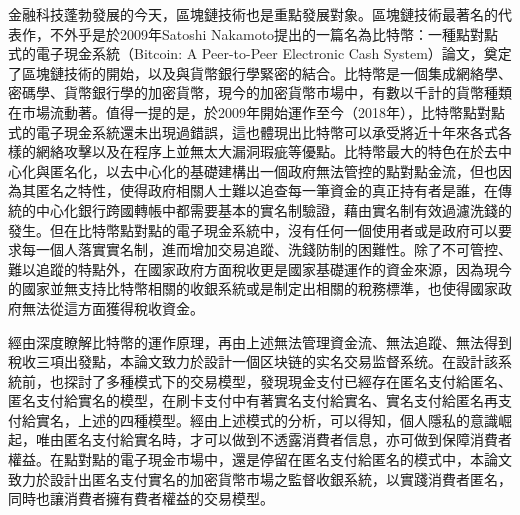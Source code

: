 \begin{cabstract}

	金融科技蓬勃發展的今天，區塊鏈技術也是重點發展對象。區塊鏈技術最著名的代表作，不外乎是於2009年Satoshi Nakamoto提出的一篇名為比特幣：一種點對點式的電子現金系統（Bitcoin: A Peer-to-Peer Electronic Cash System）論文\parencite{bitcoinpaper}，奠定了區塊鏈技術的開始，以及與貨幣銀行學緊密的結合。比特幣是一個集成網絡學、密碼學、貨幣銀行學的加密貨幣，現今的加密貨幣市場中，有數以千計的貨幣種類在市場流動著。值得一提的是，於2009年開始運作至今（2018年），比特幣點對點式的電子現金系統還未出現過錯誤，這也體現出比特幣可以承受將近十年來各式各樣的網絡攻擊以及在程序上並無太⼤漏洞瑕疵等優點。比特幣最大的特色在於去中心化與匿名化，以去中⼼化的基礎建構出⼀個政府無法管控的點對點⾦流，但也因為其匿名之特性，使得政府相關人⼠難以追查每⼀筆資⾦的真正持有者是誰，在傳統的中心化銀行跨國轉帳中都需要基本的實名制驗證，藉由實名制有效過濾洗錢的發生。但在比特幣點對點的電子現金系統中，沒有任何一個使用者或是政府可以要求每一個人落實實名制，進而增加交易追蹤、洗錢防制的困難性。除了不可管控、難以追蹤的特點外，在國家政府方面稅收更是國家基礎運作的資⾦來源，因為現今的國家並無支持比特幣相關的收銀系統或是制定出相關的稅務標準，也使得國家政府無法從這方面獲得稅收資金。

	經由深度瞭解比特幣的運作原理，再由上述無法管理資金流、無法追蹤、無法得到稅收三項出發點，本論文致力於設計一個区块链的实名交易监督系统。在設計該系統前，也探討了多種模式下的交易模型，發現現金支付已經存在匿名支付給匿名、匿名支付給實名的模型，在刷卡支付中有著實名支付給實名、實名支付給匿名再支付給實名，上述的四種模型。經由上述模式的分析，可以得知，個人隱私的意識崛起，唯由匿名支付給實名時，才可以做到不透露消費者信息，亦可做到保障消費者權益。在點對點的電子現金市場中，還是停留在匿名支付給匿名的模式中，本論⽂致⼒於設計出匿名⽀付實名的加密貨幣市場之監督收銀系統，以實踐消費者匿名，同時也讓消費者擁有費者權益的交易模型。
\end{cabstract}

